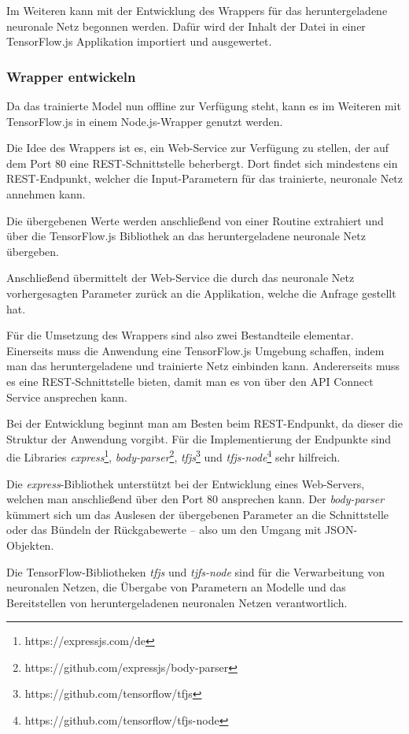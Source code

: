 Im Weiteren kann mit der Entwicklung des Wrappers für das heruntergeladene neuronale Netz begonnen werden. Dafür wird
der Inhalt der Datei in einer TensorFlow.js Applikation importiert und ausgewertet.

\subsubsection{Wrapper entwickeln}
Da das trainierte Model nun offline zur Verfügung steht, kann es im Weiteren mit TensorFlow.js in einem Node.js-Wrapper
genutzt werden.

Die Idee des Wrappers ist es, ein Web-Service zur Verfügung zu stellen, der auf dem Port 80 eine REST-Schnittstelle
beherbergt. Dort findet sich mindestens ein REST-Endpunkt, welcher die Input-Parametern für das trainierte,
neuronale Netz annehmen kann.

Die übergebenen Werte werden anschließend von einer Routine extrahiert und über die TensorFlow.js Bibliothek an das
heruntergeladene neuronale Netz übergeben.

Anschließend übermittelt der Web-Service die durch das neuronale Netz vorhergesagten Parameter zurück an die Applikation,
welche die Anfrage gestellt hat.

Für die Umsetzung des Wrappers sind also zwei Bestandteile elementar. Einerseits muss die Anwendung eine TensorFlow.js
Umgebung schaffen, indem man das heruntergeladene und trainierte Netz einbinden kann. Andererseits muss es eine
REST-Schnittstelle bieten, damit man es von über den API Connect Service ansprechen kann.

Bei der Entwicklung beginnt man am Besten beim REST-Endpunkt, da dieser die Struktur der Anwendung vorgibt. Für die
Implementierung der Endpunkte sind die Libraries \textit{express}\footnote{https://expressjs.com/de},
\textit{body-parser}\footnote{https://github.com/expressjs/body-parser}, \textit{tfjs}\footnote{https://github.com/tensorflow/tfjs} 
und \textit{tfjs-node}\footnote{https://github.com/tensorflow/tfjs-node} sehr hilfreich.

Die \textit{express}-Bibliothek unterstützt bei der Entwicklung eines Web-Servers, welchen man anschließend über den
Port 80 ansprechen kann. Der \textit{body-parser} kümmert sich um das Auslesen der übergebenen Parameter an die
Schnittstelle oder das Bündeln der Rückgabewerte -- also um den Umgang mit JSON-Objekten.

Die TensorFlow-Bibliotheken \textit{tfjs} und \textit{tjfs-node} sind für die Verwarbeitung von neuronalen Netzen,
die Übergabe von Parametern an Modelle und das Bereitstellen von heruntergeladenen neuronalen Netzen verantwortlich.

